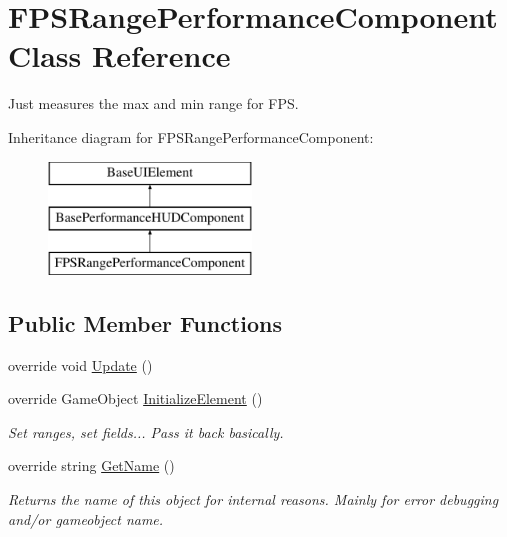 \hypertarget{class_f_p_s_range_performance_component}{}\section{F\+P\+S\+Range\+Performance\+Component Class Reference}
\label{class_f_p_s_range_performance_component}


Just measures the max and min range for F\+PS.  


Inheritance diagram for F\+P\+S\+Range\+Performance\+Component\+:\begin{figure}[H]
\begin{center}
\leavevmode
\includegraphics[height=3.000000cm]{class_f_p_s_range_performance_component}
\end{center}
\end{figure}
\subsection*{Public Member Functions}
\begin{DoxyCompactItemize}
\item 
override void \hyperlink{class_f_p_s_range_performance_component_aa556fcde95018c2a43f0e54f746c7980}{Update} ()
\item 
override Game\+Object \hyperlink{class_f_p_s_range_performance_component_ab0f8d2e573a831035521296503b274fc}{Initialize\+Element} ()
\begin{DoxyCompactList}\small\item\em Set ranges, set fields... Pass it back basically. \end{DoxyCompactList}\item 
override string \hyperlink{class_f_p_s_range_performance_component_a67b39af33ece4ca186a9bdc92baf5220}{Get\+Name} ()
\begin{DoxyCompactList}\small\item\em Returns the name of this object for internal reasons. Mainly for error debugging and/or gameobject name. \end{DoxyCompactList}\end{DoxyCompactItemize}
